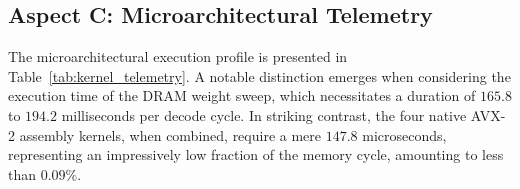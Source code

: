 \documentclass[journal,10pt,twocolumn]{article}
\theoremstyle{definition}
\begin{document}
\subsection{Aspect C: Microarchitectural Telemetry}

The microarchitectural execution profile is presented in Table~\ref{tab:kernel_telemetry}. A notable distinction emerges when considering the execution time of the DRAM weight sweep, which necessitates a duration of $165.8$ to $194.2$ milliseconds per decode cycle. In striking contrast, the four native AVX-2 assembly kernels, when combined, require a mere $147.8$ microseconds, representing an impressively low fraction of the memory cycle, amounting to less than $\boxed{0.09\%}$.

\begin{table}[ht]
\centering
{}
\caption{Microarchitectural Latency Profile of AVX-2 Kernels.}
\label{tab:kernel_telemetry}
\end{table}
\end{document}
